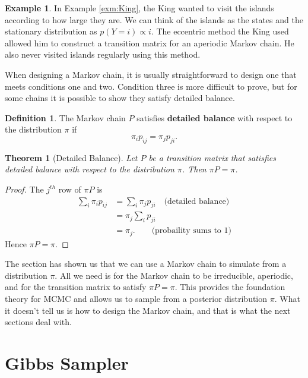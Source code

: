 \documentclass[
]{book}
\newtheorem{theorem}{Theorem}[chapter]
\theoremstyle{definition}
\newtheorem{definition}{Definition}[chapter]
\theoremstyle{definition}
\newtheorem{example}{Example}[chapter]
\theoremstyle{definition}
\theoremstyle{definition}
\theoremstyle{remark}
\begin{document}
\begin{example}
In Example \ref{exm:King}, the King wanted to visit the islands according to how large they are. We can think of the islands as the states and the stationary distribution as \(p(Y = i) \propto i\). The eccentric method the King used allowed him to construct a transition matrix for an aperiodic Markov chain. He also never visited islands regularly using this method.
\end{example}

When designing a Markov chain, it is usually straightforward to design one that meets conditions one and two. Condition three is more difficult to prove, but for some chains it is possible to show they satisfy detailed balance.

\begin{definition}
The Markov chain \(P\) satisfies \textbf{detailed balance} with respect to the distribution \(\pi\) if
\[
\pi_i p_{ij} = \pi_j p_{ji}. 
\]
\end{definition}

\begin{theorem}[Detailed Balance]
Let \(P\) be a transition matrix that satisfies detailed balance with respect to the distribution \(\pi\). Then \(\pi P = \pi\).
\end{theorem}

\begin{proof}
The \(j^{th}\) row of \(\pi P\) is
\begin{align*}
\sum_{i} \pi_i p_{ij} & = \sum_{i} \pi_j p_{ji} \quad \textrm{(detailed balance)} \\
 & = \pi_j \sum_{i} p_{ji} \\
 & = \pi_j.\qquad \textrm{(probaility sums to 1)}
\end{align*}
Hence \(\pi P = \pi\).
\end{proof}

The section has shown us that we can use a Markov chain to simulate from a distribution \(\pi\). All we need is for the Markov chain to be irreducible, aperiodic, and for the transition matrix to satisfy \(\pi P = \pi\). This provides the foundation theory for MCMC and allows us to sample from a posterior distribution \(\pi\). What it doesn't tell us is how to design the Markov chain, and that is what the next sections deal with.

\hypertarget{gibbs-sampler}{%
\section{Gibbs Sampler}\label{gibbs-sampler}}
\end{document}
